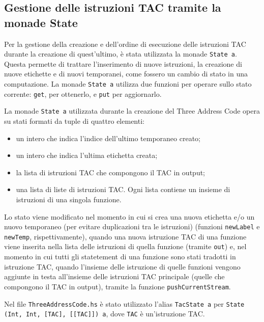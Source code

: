 \subsection{Gestione delle istruzioni TAC tramite la monade State}

Per la gestione della creazione e dell'ordine di esecuzione delle istruzioni TAC durante la creazione di quest'ultimo, è stata utilizzata la monade {\tt State a}. Questa permette di trattare l'inserimento di nuove istruzioni, la creazione di nuove etichette e di nuovi temporanei, come fossero un cambio di stato in una computazione. La monade {\tt State a} utilizza due funzioni per operare sullo stato corrente: {\tt get}, per ottenerlo, e {\tt put} per aggiornarlo. 

La monade {\tt State a} utilizzata durante la creazione del Three Address Code opera su stati formati da tuple di quattro elementi:
\begin{itemize}
    \item un intero che indica l'indice dell'ultimo temporaneo creato;
    \item un intero che indica l'ultima etichetta creata;
    \item la lista di istruzioni TAC che compongono il TAC in output;
    \item una lista di liste di istruzioni TAC. Ogni lista contiene un insieme di istruzioni di una singola funzione. 
\end{itemize}

Lo stato viene modificato nel momento in cui si crea una nuova etichetta e/o un nuovo temporaneo (per evitare duplicazioni tra le istruzioni) (funzioni {\tt newLabel} e {\tt newTemp}, rispettivamente), quando una nuova istruzione TAC di una funzione viene inserita nella lista delle istruzioni di quella funzione (tramite {\tt out}) e, nel momento in cui tutti gli statetement di una funzione sono stati tradotti in istruzione TAC, quando l'insieme delle istruzione di quelle funzioni vengono aggiunte in testa all'insieme delle istruzioni TAC principale (quelle che compongono il TAC in output), tramite la funzione {\tt pushCurrentStream}.

Nel file {\tt ThreeAddressCode.hs} è stato utilizzato l'alias {\tt TacState a} per {\tt State (Int, Int, [TAC], [[TAC]]) a}, dove {\tt TAC} è un'istruzione TAC.